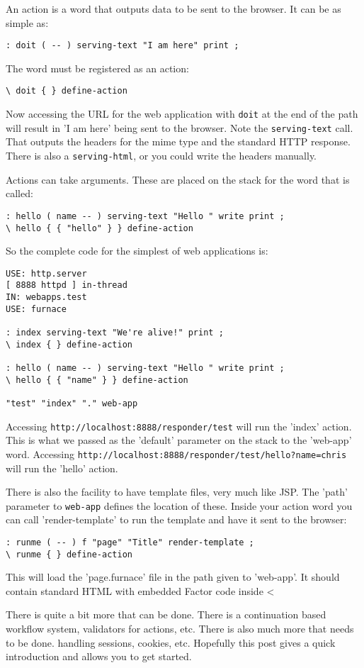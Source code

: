 An action is a word that outputs data to be sent to the browser. It
can be as simple as:
\begin{verbatim}
: doit ( -- ) serving-text "I am here" print ;
\end{verbatim}

The word must be registered as an action:

\begin{verbatim}
\ doit { } define-action
\end{verbatim}

Now accessing the URL for the web application with \texttt{doit} at
the end of the path will result in 'I am here' being sent to the
browser. Note the \texttt{serving-text} call. That outputs the headers
for the mime type and the standard HTTP response. There is also a
\texttt{serving-html}, or you could write the headers manually.

Actions can take arguments. These are placed on the stack for the word
that is called:
\begin{verbatim}
: hello ( name -- ) serving-text "Hello " write print ;
\ hello { { "hello" } } define-action
\end{verbatim}

So the complete code for the simplest of web applications is:

\begin{verbatim}
USE: http.server
[ 8888 httpd ] in-thread
IN: webapps.test
USE: furnace

: index serving-text "We're alive!" print ;
\ index { } define-action 

: hello ( name -- ) serving-text "Hello " write print ;
\ hello { { "name" } } define-action

"test" "index" "." web-app
\end{verbatim}

Accessing \texttt{http://localhost:8888/responder/test} will run the 'index'
action. This is what we passed as the 'default' parameter on the stack
to the 'web-app' word. Accessing
\texttt{http://localhost:8888/responder/test/hello?name=chris} will run the
'hello' action.

There is also the facility to have template files, very much like
JSP. The 'path' parameter to \texttt{web-app} defines the location of
these. Inside your action word you can call 'render-template' to run
the template and have it sent to the browser:
\begin{verbatim}
: runme ( -- ) f "page" "Title" render-template ;
\ runme { } define-action
\end{verbatim}

This will load the 'page.furnace' file in the path given to 'web-app'. It should contain standard HTML with embedded Factor code inside <%

There is quite a bit more that can be done. There is a continuation
based workflow system, validators for actions, etc. There is also much
more that needs to be done. handling sessions, cookies, etc. Hopefully
this post gives a quick introduction and allows you to get started.

